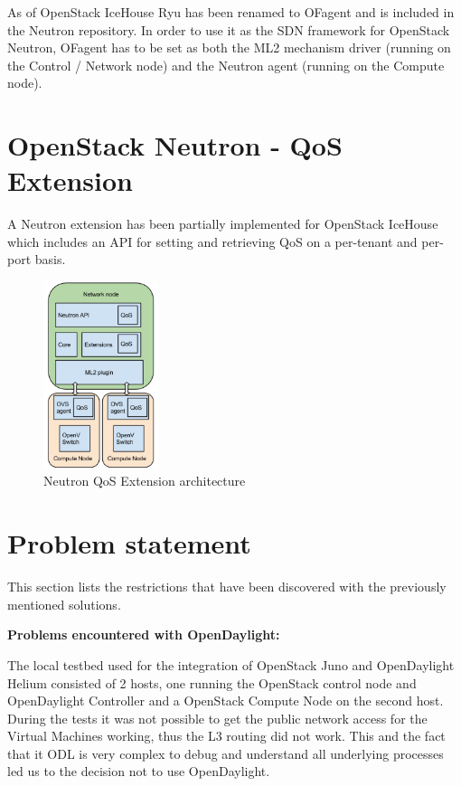 As of OpenStack IceHouse Ryu has been renamed to OFagent and is included in the Neutron repository. In order to use it as the SDN framework for OpenStack Neutron, OFagent has to be set as both the ML2 mechanism driver (running on the Control / Network node) and the Neutron agent (running on the Compute node). 


\section{OpenStack Neutron - QoS Extension}

A Neutron extension has been partially implemented for OpenStack IceHouse which includes an API for setting and retrieving QoS on a per-tenant and per-port basis.


\begin{figure}[H]
\centering
\includegraphics[width=0.3\textwidth]{images/sota/neutron_qos_extension.png}
\caption{Neutron QoS Extension architecture}
\end{figure}



\section{Problem statement}

This section lists the restrictions that have been discovered with the previously mentioned solutions. 


\textbf{Problems encountered with OpenDaylight:}

The local testbed used for the integration of OpenStack Juno and OpenDaylight Helium consisted of 2 hosts, one running the OpenStack control node and OpenDaylight Controller and a OpenStack Compute Node on the second host. During the tests it was not possible to get the public network access for the Virtual Machines working, thus the L3 routing did not work. This and the fact that it ODL is very complex to debug and understand all underlying processes led us to the decision not to use OpenDaylight.


